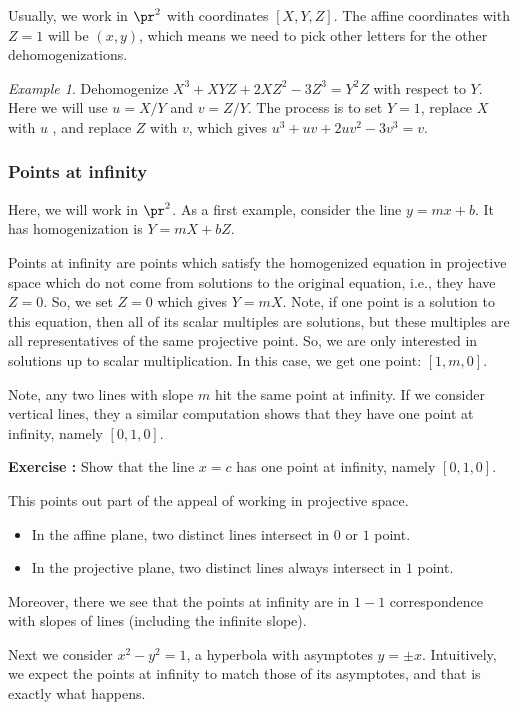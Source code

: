 \documentclass[12pt]{amsart}
\newcounter{probs}
\newenvironment{prob}{%
  \refstepcounter{probs}
  \par\medskip\noindent\textbf{Exercise \theprobs:} }{\par\medskip}
\theoremstyle{plain}
\theoremstyle{definition}
\theoremstyle{remark}
\newtheorem*{exam}{Example}
\begin{document}
Usually, we work in $\pr^2$ with coordinates $[X,Y,Z]$.  The affine
coordinates with $Z=1$ will be $(x,y)$, which means we need to pick
other letters for the other dehomogenizations.
\begin{exam}
  Dehomogenize $X^3+XYZ + 2XZ^2 -3Z^3 = Y^2Z$ with respect to $Y$.
  Here we will use $u=X/Y$ and $v=Z/Y$.  The process is to set $Y=1$,
  replace $X$ with $u$ , and replace $Z$ with $v$, which gives
  $u^3+uv+2uv^2-3v^3 = v$.
\end{exam}

\subsubsection{Points at infinity}

Here, we will work in $\pr^2$.  As a first example, consider
the line $y=mx+b$.  It has homogenization is $Y=mX+bZ$.

Points at infinity are points which satisfy the homogenized equation
in projective space which do not come from solutions to the
original equation, i.e., they have $Z=0$.  So, we set $Z=0$ which
gives $Y=mX$.  Note, if one point is a solution to
this equation, then all of its scalar multiples are solutions, but
these multiples are all representatives of the same projective point.
So, we are only interested in solutions up to scalar multiplication.
In this case, we get one point: $[1,m,0]$.

Note, any two lines with slope $m$ hit the same point at infinity.  If
we consider vertical lines, they a similar computation shows that they
have one point at infinity, namely $[0,1,0]$.
\begin{prob}
  Show that the line $x=c$ has one point at infinity, namely
  $[0,1,0]$.
\end{prob}

This points out part of the appeal of working in projective space.
\begin{itemize}
\item  In the affine plane, two distinct lines intersect in $0$ or $1$
  point.
\item  In the projective plane, two distinct lines always intersect in $1$
  point.
\end{itemize}
Moreover, there we see that the points at infinity are in $1-1$
correspondence with slopes of lines (including the infinite slope).

Next we consider $x^2-y^2=1$, a hyperbola with asymptotes $y=\pm x$.
Intuitively, we expect the points at infinity to match those of its
asymptotes, and that is exactly what happens.  
\end{document}

